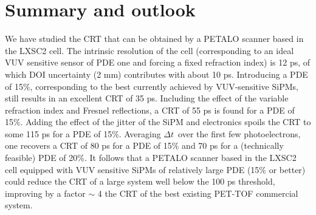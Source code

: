 \documentclass[11pt,a4paper]{article}
\begin{document}
%  
%


\section{Summary and outlook}\label{sec.conclu}

We have studied the CRT that can be obtained by a PETALO scanner based in the LXSC2 cell. The intrinsic resolution of the cell (corresponding to an ideal VUV sensitive sensor of PDE one and forcing a fixed refraction index) is 12 ps, of which DOI uncertainty (2 mm) contributes with about 10 ps. Introducing a PDE of 15\%, corresponding to the best currently achieved by VUV-sensitive SiPMs, still results in an excellent CRT of  35 ps. Including the effect of the variable refraction index and Fresnel reflections, a CRT of 55 ps is found for a PDE of 15\%. Adding the effect of the jitter of the SiPM and electronics spoils the CRT to some 115 ps for a PDE of 15\%. Averaging $\Delta t$~over the first few photoelectrons, one recovers a CRT of 80 ps for a PDE of 15\% and 70 ps for a (technically feasible) PDE of 20\%. It follows that a PETALO scanner based in the LXSC2 cell equipped with VUV sensitive SiPMs of relatively large PDE (15\% or better) could reduce the CRT of a large system well below the 100 ps threshold, improving by a factor $\sim$ 4 the CRT of the best existing
PET-TOF commercial system. 
\end{document}

